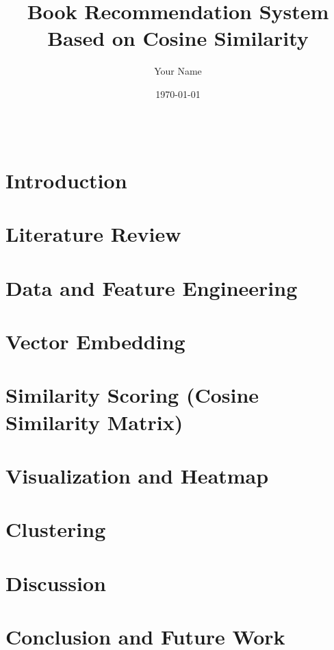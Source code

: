 \documentclass[12pt]{article}
\title{Book Recommendation System Based on Cosine Similarity}
\author{Your Name}
\date{\today}
\begin{document}
	
	\maketitle
	
	\begin{abstract}
		
		~\cite{clusteringlikeapro}
	\end{abstract}
	
	\tableofcontents
	\newpage
	
	\section{Introduction}
	
	
	\section{Literature Review}
	
	
	\section{Data and Feature Engineering}
	
	
	\section{Vector Embedding}
	
	
	\section{Similarity Scoring (Cosine Similarity Matrix)}
	
	
	\section{Visualization and Heatmap}
	
	
	\section{Clustering} 
	
	
	\section{Discussion}
	
	
	\section{Conclusion and Future Work}
	
	
	
	
	
\end{document}
